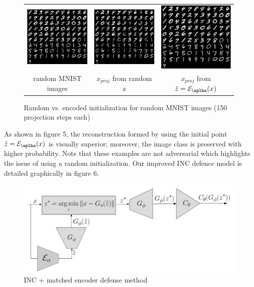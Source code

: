 \documentclass{article}
\theoremstyle{definition}
\begin{document}
\begin{figure}[H]
\centering
\begin{tabular}{ccc}
\includegraphics[width=2in]{reconstr_original.png} &
\includegraphics[width=2in]{reconstr_random_z.png} &
\includegraphics[width=2in]{reconstr_encoded.png} \\
random MNIST images &
$x_{proj}$ from random z &
$x_{proj}$ from $\hat{z} = \mathcal{E}_{\aplha}(x)$
\end{tabular}
\caption{Random vs. encoded initialization for random MNIST images (150 projection steps each)}

\end{figure}

As shown in figure 5, the reconstruction formed by using the initial point $\hat{z} = \mathcal{E}_{\aplha}(x) $ is visually superior; moreover, the image class is preserved with higher probability. Note that these examples are not adversarial which highlights the issue of using a random initialization. Our improved INC defence model is detailed graphically in figure 6.

\begin{figure}[H]
\centering
\includegraphics[scale=0.25]{INC++.png}
\caption{INC + matched encoder defense method }

\end{figure}
\end{document}
